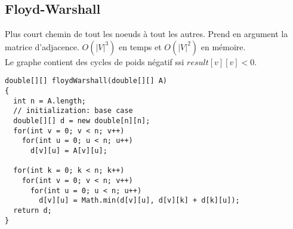 \subsection{Floyd-Warshall}
Plus court chemin de tout les noeuds à tout les autres. Prend en argument la matrice d'adjacence. $O(|V|^3)$ en temps et $O(|V|^2)$ en mémoire.\\
Le graphe contient des cycles de poids négatif ssi $result[v][v]<0$.\\

\begin{lstlisting}
double[][] floydWarshall(double[][] A)
{
  int n = A.length;
  // initialization: base case
  double[][] d = new double[n][n];
  for(int v = 0; v < n; v++)
    for(int u = 0; u < n; u++)
      d[v][u] = A[v][u];

  for(int k = 0; k < n; k++)
    for(int v = 0; v < n; v++)
      for(int u = 0; u < n; u++)
        d[v][u] = Math.min(d[v][u], d[v][k] + d[k][u]);
  return d;
}
\end{lstlisting}
